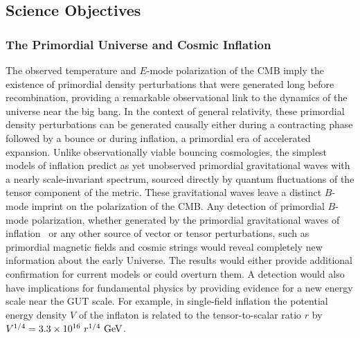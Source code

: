 
\subsection{Science Objectives}
\label{sec:science}

\vspace{-0.05in}
 
\subsubsection{The Primordial Universe and Cosmic Inflation}

\vspace{-0.05in}

The observed temperature and $E$-mode polarization of the \ac{CMB} imply the existence of primordial density perturbations that were generated long before recombination, providing a remarkable observational link to the dynamics of the universe near the big bang.
In the context of general relativity, these primordial density perturbations can be generated causally either during a contracting phase followed by a bounce or during inflation, a primordial era of accelerated expansion.
Unlike observationally viable bouncing cosmologies, the simplest models of inflation predict as yet unobserved primordial gravitational waves with a nearly scale-invariant spectrum, sourced directly by quantum fluctuations of the tensor component of the metric. 
These gravitational waves leave a distinct $B$-mode imprint on the polarization of the \ac{CMB}. Any detection of primordial $B$-mode polarization, whether generated by the primordial gravitational waves of inflation~\cite{kamionkowski97a,zaldarriaga97} or any other source of vector or tensor perturbations, such as primordial magnetic fields \cite{Seshadri:2000ky,Lewis:2004ef,Ade:2015cao,Zucca:2016iur} and cosmic strings \cite{Turok:1997gj,Seljak:2006hi,Avgoustidis:2011ax,Moss:2014cra} would reveal completely new information about the early Universe. The results would either provide additional confirmation for current models or could overturn them. A detection would also have implications for fundamental physics by providing evidence for a new energy scale near the GUT scale. For example, in single-field inflation the potential energy density $V$ of the inflaton is related to the tensor-to-scalar ratio $r$ by $V^{1/4} = 3.3 \times 10^{16} \ r^{1/4}\,\, {\rm GeV}$. 

